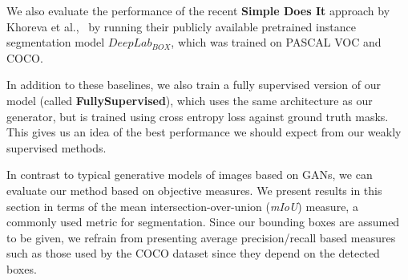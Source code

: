 \documentclass[runningheads]{llncs}
\begin{document}
We also evaluate the performance of the recent {\bf Simple Does It} approach
by Khoreva et al.,~\cite{khoreva2016simple} by running their publicly available pretrained instance segmentation model $DeepLab_{BOX}$, which was trained on PASCAL VOC \cite{pascal-voc-2012} and COCO.

In addition to these baselines, we also train a fully supervised version of our model (called {\bf FullySupervised}), which uses the same architecture as our generator, but is trained using cross entropy loss against ground truth masks. This gives us an idea of the best performance we should expect from our weakly supervised methods.


In contrast to typical generative models of images based on GANs, we can evaluate our method based on objective measures. We present results in this section in terms of the mean intersection-over-union (\emph{mIoU}) measure,
a commonly used metric for segmentation. Since our bounding boxes are assumed to be given, 
we refrain from presenting average precision/recall based measures such as those used by the COCO dataset since they depend on the detected boxes. 
\end{document}
